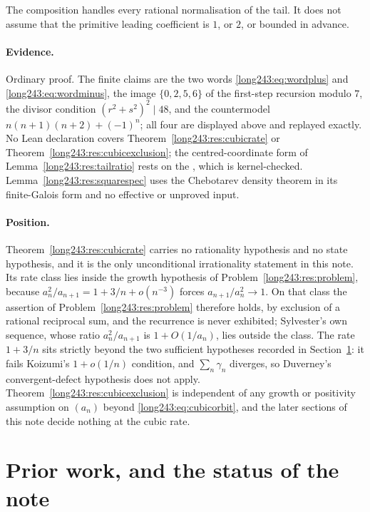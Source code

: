 \documentclass[11pt]{article}
\begin{document}
The composition handles every rational normalisation of the tail.  It does not
assume that the primitive leading coefficient is $1$, or $2$, or bounded in
advance.

\paragraph{Evidence.}
Ordinary proof.  The finite claims are the two words \eqref{long243:eq:wordplus}
and \eqref{long243:eq:wordminus}, the image $\{0,2,5,6\}$ of the first-step recursion
modulo $7$, the divisor condition $(r^2+s^2)^2\mid48$, and the countermodel
$n(n+1)(n+2)+(-1)^n$; all four are displayed above and replayed exactly.  No Lean
declaration covers Theorem~\ref{long243:res:cubicrate} or
Theorem~\ref{long243:res:cubicexclusion}; the centred-coordinate form of
Lemma~\ref{long243:res:tailratio} rests on the
, which is kernel-checked.  Lemma~\ref{long243:res:squarespec} uses the
Chebotarev density theorem in its finite-Galois form and no effective or
unproved input.

\paragraph{Position.}
Theorem~\ref{long243:res:cubicrate} carries no rationality hypothesis and no state
hypothesis, and it is the only unconditional irrationality statement in this
note.  Its rate class lies inside the growth hypothesis of
Problem~\ref{long243:res:problem}, because $a_n^2/a_{n+1}=1+3/n+o(n^{-3})$ forces
$a_{n+1}/a_n^2\to1$.  On that class the assertion of Problem~\ref{long243:res:problem}
therefore holds, by exclusion of a rational reciprocal sum, and the recurrence
is never exhibited; Sylvester's own sequence, whose ratio $a_n^2/a_{n+1}$ is
$1+O(1/a_n)$, lies outside the class.  The rate $1+3/n$ sits strictly beyond
the two sufficient hypotheses recorded in Section~\ref{long243:sec:priorwork}: it fails
Koizumi's $1+o(1/n)$ condition, and $\sum_n\gamma_n$ diverges, so Duverney's
convergent-defect hypothesis does not apply.  Theorem~\ref{long243:res:cubicexclusion}
is independent of any growth or positivity assumption on $(a_n)$ beyond
\eqref{long243:eq:cubicorbit}, and the later sections of this note decide nothing at
the cubic rate.

\section{Prior work, and the status of the note}\label{long243:sec:priorwork}
\end{document}
